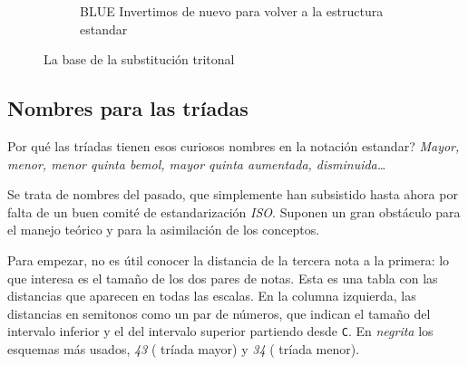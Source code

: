 \documentclass[]{article}
\begin{document}
\begin{figure}[H]
\begin{subfigure}{0.30\textwidth}
	  \end{subfigure}
	  \hfill	
	  \begin{subfigure}{0.30\textwidth}
		\centering
		\caption{\textsf{BLUE} Invertimos de nuevo para volver a la estructura estandar}
		
	  \end{subfigure}
	  \hfill	
    \caption{La base de la substitución tritonal}\label{fig:tritonal-substitution}
	\end{figure}

  

  \subsection{Nombres para las tríadas}

  Por qué las tríadas tienen esos curiosos nombres en la notación estandar? \emph{Mayor, menor, menor quinta bemol, mayor quinta   aumentada, disminuida\ldots{}}
  
  Se trata de nombres del pasado, que simplemente han subsistido hasta ahora por falta de un buen comité de estandarización \emph{ISO}. Suponen un gran obstáculo para el manejo teórico y para la asimilación de los conceptos.
  
  Para empezar, no es útil conocer la distancia de la tercera nota a la primera: lo que interesa es el tamaño de los dos pares de notas. Esta es una tabla con las distancias que aparecen en todas las escalas. En la columna izquierda, las distancias en semitonos como un par de números, que indican el tamaño del intervalo inferior y el del intervalo superior partiendo desde \texttt{C}. En \emph{negrita} los esquemas más usados, \emph{43} ( tríada mayor) y \emph{34} ( tríada menor).
  
\end{document}
